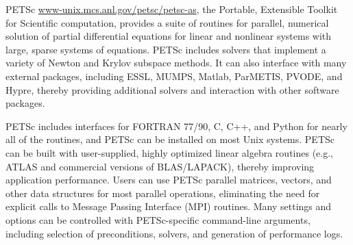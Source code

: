 PETSc \url{www-unix.mcs.anl.gov/petsc/petsc-as}, the Portable, Extensible
Toolkit for Scientific computation, provides a suite of routines for
parallel, numerical solution of partial differential equations for
linear and nonlinear systems with large, sparse systems of equations.
PETSc includes solvers that implement a variety of Newton and Krylov
subspace methods. It can also interface with many external packages,
including ESSL, MUMPS, Matlab, ParMETIS, PVODE, and Hypre, thereby
providing additional solvers and interaction with other software packages.

PETSc includes interfaces for FORTRAN 77/90, C, C++, and Python for
nearly all of the routines, and PETSc can be installed on most Unix
systems. PETSc can be built with user-supplied, highly optimized linear
algebra routines (e.g., ATLAS and commercial versions of BLAS/LAPACK),
thereby improving application performance. Users can use PETSc parallel
matrices, vectors, and other data structures for most parallel operations,
eliminating the need for explicit calls to Message Passing Interface
(MPI) routines. Many settings and options can be controlled with PETSc-specific
command-line arguments, including selection of preconditions, solvers,
and generation of performance logs.
